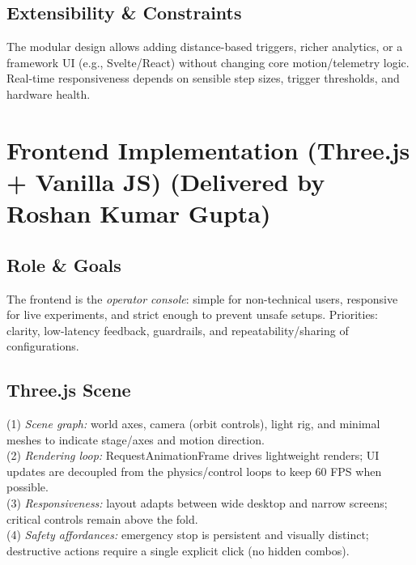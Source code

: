 \documentclass[
    twocolumn,
    fontsize = 10pt,
    parskip = half+,
    headings = small,
    headwidth = text,
    footwidth = text,
]{scrartcl}
\begin{document}
\subsection{Extensibility \& Constraints}
The modular design allows adding distance-based triggers, richer analytics, or a framework UI (e.g., Svelte/React) without changing core motion/telemetry logic. Real-time responsiveness depends on sensible step sizes, trigger thresholds, and hardware health.


\section{Frontend Implementation (Three.js + Vanilla JS) \textnormal{(Delivered by Roshan Kumar Gupta)}}
\label{sec:frontend}

\subsection{Role \& Goals}
The frontend is the \emph{operator console}: simple for non-technical users, responsive for live experiments, and strict enough to prevent unsafe setups. Priorities: clarity, low-latency feedback, guardrails, and repeatability/sharing of configurations.

\subsection{Three.js Scene}
(1) \emph{Scene graph:} world axes, camera (orbit controls), light rig, and minimal meshes to indicate stage/axes and motion direction.\\

(2) \emph{Rendering loop:} RequestAnimationFrame drives lightweight renders; UI updates are decoupled from the physics/control loops to keep 60 FPS when possible.\\

(3) \emph{Responsiveness:} layout adapts between wide desktop and narrow screens; critical controls remain above the fold.\\

(4) \emph{Safety affordances:} emergency stop is persistent and visually distinct; destructive actions require a single explicit click (no hidden combos).\\
\end{document}
